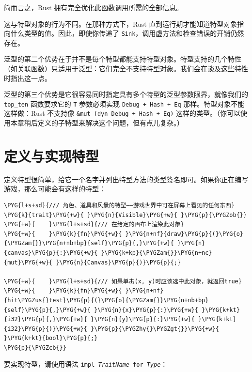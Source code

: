 简而言之，Rust 拥有完全优化此函数调用所需的全部信息。

这与特型对象的行为不同。在那种方式下，Rust 直到运行期才能知道特型对象指向什么类型的值。因此，即使你传递了 \texttt{Sink}，调用虚方法和检查错误的开销仍然存在。

泛型的第二个优势在于并不是每个特型都能支持特型对象。特型支持的几个特性（如关联函数）只适用于泛型：它们完全不支持特型对象。我们会在谈及这些特性时指出这一点。

泛型的第三个优势是它很容易同时指定具有多个特型的泛型参数限界，就像我们的 \texttt{top\_ten} 函数要求它的 \texttt{T} 参数必须实现 \texttt{Debug + Hash + Eq} 那样。特型对象不能这样做：Rust 不支持像 \texttt{\&mut (dyn Debug + Hash + Eq)} 这样的类型。（你可以使用本章稍后定义的子特型来解决这个问题，但有点儿复杂。）

\section{定义与实现特型}

定义特型很简单，给它一个名字并列出特型方法的类型签名即可。如果你正在编写游戏，那么可能会有这样的特型：

\begin{Verbatim}[commandchars=\\\{\},breaklines=true,breakanywhere=true,fontsize=\codefont,xleftmargin=17bp]
\PYG{l+s+sd}{/// 角色、道具和风景的特型——游戏世界中可在屏幕上看见的任何东西}
\PYG{k}{trait}\PYG{+w}{ }\PYG{n}{Visible}\PYG{+w}{ }\PYG{p}{\PYGZob{}}
\PYG{+w}{    }\PYG{l+s+sd}{/// 在给定的画布上渲染此对象}
\PYG{+w}{    }\PYG{k}{fn}\PYG{+w}{ }\PYG{n+nf}{draw}\PYG{p}{(}\PYG{o}{\PYGZam{}}\PYG{n+nb+bp}{self}\PYG{p}{,}\PYG{+w}{ }\PYG{n}{canvas}\PYG{p}{:}\PYG{+w}{ }\PYG{k+kp}{\PYGZam{}}\PYG{n+nc}{mut}\PYG{+w}{ }\PYG{n}{Canvas}\PYG{p}{)}\PYG{p}{;}

\PYG{+w}{    }\PYG{l+s+sd}{/// 如果单击(x, y)时应该选中此对象，就返回true}
\PYG{+w}{    }\PYG{k}{fn}\PYG{+w}{ }\PYG{n+nf}{hit\PYGZus{}test}\PYG{p}{(}\PYG{o}{\PYGZam{}}\PYG{n+nb+bp}{self}\PYG{p}{,}\PYG{+w}{ }\PYG{n}{x}\PYG{p}{:}\PYG{+w}{ }\PYG{k+kt}{i32}\PYG{p}{,}\PYG{+w}{ }\PYG{n}{y}\PYG{p}{:}\PYG{+w}{ }\PYG{k+kt}{i32}\PYG{p}{)}\PYG{+w}{ }\PYG{p}{\PYGZhy{}\PYGZgt{}}\PYG{+w}{ }\PYG{k+kt}{bool}\PYG{p}{;}
\PYG{p}{\PYGZcb{}}
\end{Verbatim}

要实现特型，请使用语法 \texttt{impl \emph{TraitName} for \emph{Type}}：

